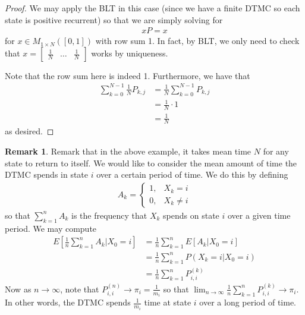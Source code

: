 \documentclass[11pt]{amsart}
\theoremstyle{definition}
\newtheorem{remark}[theorem]{Remark}
\numberwithin{equation}{section}
\begin{document}
 \begin{proof}
     We may apply the BLT in this case (since we have a finite DTMC so each state is positive recurrent) so that we are simply solving for
     \begin{align*}
         xP=x
     \end{align*}
     for $x\in M_{1\times N}([0,1])$ with row sum 1. In fact, by BLT, we only need to check that $x=\begin{bmatrix}
         \frac{1}{N} & \ldots & \frac{1}{N}
     \end{bmatrix}$ works by uniqueness.

     Note that the row sum here is indeed 1. Furthermore, we have that
     \begin{align*}
         \sum_{k=0}^{N-1}\frac{1}{N}P_{k,j}&=\frac{1}{N}\sum_{k=0}^{N-1}P_{k,j}\\
         &=\frac{1}{N}\cdot1\\
         &=\frac{1}{N}
     \end{align*}
     as desired.
 \end{proof}
 \begin{remark}
     Remark that in the above example, it takes mean time $N$ for any state to return to itself. We would like to consider the mean amount of time the DTMC spends in state $i$ over a certain period of time. We do this by defining
     \begin{align*}
         A_k=\begin{cases}
             1, & X_k=i\\
             0, & X_k\ne i
         \end{cases}
     \end{align*}
     so that $\sum_{k=1}^nA_k$ is the frequency that $X_k$ spends on state $i$ over a given time period. We may compute
     \begin{align*}
         E[\frac{1}{n}\sum_{k=1}^nA_k|X_0=i]&=\frac{1}{n}\sum_{k=1}^nE[A_k|X_0=i]\\
         &=\frac{1}{n}\sum_{k=1}^nP(X_k=i|X_0=i)\\
         &=\frac{1}{n}\sum_{k=1}^nP_{i,i}^{(k)}
     \end{align*}
     Now as $n\to\infty$, note that $P_{i,i}^{(n)}\to\pi_i=\frac{1}{m_i}$ so that $\lim_{n\to\infty}\frac{1}{n}\sum_{k=1}^n P_{i,i}^{(k)}\to\pi_i$. In other words, the DTMC spends $\frac{1}{m_i}$ time at state $i$ over a long period of time.
 \end{remark}
\end{document}
